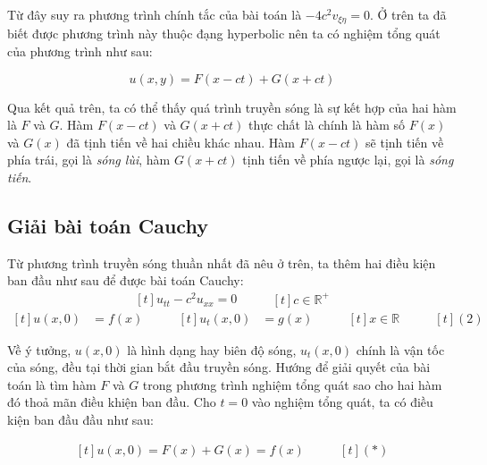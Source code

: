 \documentclass[a4paper]{article}
\begin{document}
Từ đây suy ra phương trình chính tắc của bài toán là $-4c^2v_{\xi\eta} = 0$. Ở trên ta đã biết được phương trình này thuộc đạng hyperbolic nên ta có nghiệm tổng quát của phương trình như sau:

\begin{equation*}
u(x, y) = F(x - ct) + G(x + ct)
\end{equation*}

Qua kết quả trên, ta có thể thấy quá trình truyền sóng là sự kết hợp của hai hàm là $F$ và $G$. Hàm $F(x - ct)$ và $G(x + ct)$ thực chất là chính là hàm số $F(x)$ và $G(x)$ đã tịnh tiến về hai chiều khác nhau. Hàm $F(x - ct)$ sẽ tịnh tiến về phía trái, gọi là \emph{sóng lùi}, hàm $G(x + ct)$ tịnh tiến về phía ngược lại, gọi là \emph{sóng tiến}.

\subsection{Giải bài toán Cauchy}
Từ phương trình truyền sóng thuần nhất đã nêu ở trên, ta thêm hai điều kiện ban đầu như sau để được bài toán Cauchy:
\begin{equation*}
\begin{aligned}[t]
u_{tt} - c^2u_{xx} = 0
\end{aligned}
\qquad
\begin{aligned}[t]
c \in \mathbb{R}^+
\end{aligned}
\end{equation*}
\begin{equation*}
\begin{aligned}[t]
u(x, 0) &= f(x)
\end{aligned}
\qquad
\begin{aligned}[t]
u_t(x, 0) &= g(x)
\end{aligned}
\qquad
\begin{aligned}[t]
x \in \mathbb{R}
\end{aligned}
\qquad
\begin{aligned}[t]
(2)
\end{aligned}
\end{equation*}

Về ý tưởng, $u(x, 0)$ là hình dạng hay biên độ sóng, $u_t(x, 0)$ chính là vận tốc của sóng, đều tại thời gian bắt đầu truyền sóng. Hướng để giải quyết của bài toán là tìm hàm $F$ và $G$ trong phương trình nghiệm tổng quát sao cho hai hàm đó thoả mãn điều khiện ban đầu. Cho $t = 0$ vào nghiệm tổng quát, ta có điều kiện ban đầu đầu như sau:

\begin{equation*}
\begin{aligned}[t]
u(x,0) = F(x) + G(x) = f(x)
\end{aligned}
\qquad
\begin{aligned}[t]
(*)
\end{aligned}
\end{equation*}
\end{document}
